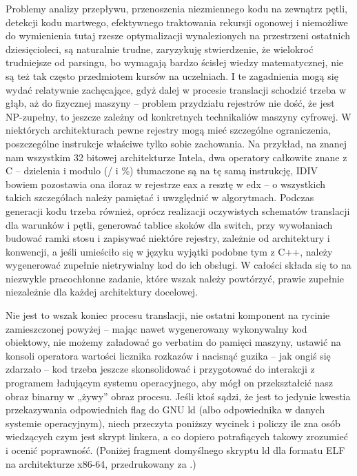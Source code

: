 Problemy analizy przepływu, przenoszenia niezmiennego kodu na zewnątrz pętli, detekcji kodu martwego, efektywnego traktowania rekursji ogonowej i niemożliwe do wymienienia tutaj rzesze optymalizacji wynalezionych na przestrzeni ostatnich dziesięcioleci, są naturalnie trudne, zaryzykuję stwierdzenie, że wielokroć trudniejsze od parsingu, bo wymagają bardzo ścisłej wiedzy matematycznej, nie są też tak często przedmiotem kursów na uczelniach. I te zagadnienia mogą się wydać relatywnie zachęcające, gdyż dalej w procesie translacji schodzić trzeba w głąb, aż do fizycznej maszyny – problem przydziału rejestrów nie dość, że jest NP-zupełny\cite{REGISTER_ALLOCATION_CHAITIN1981, REGISTER_ALLOCATION_2}, to jeszcze zależny od konkretnych technikaliów maszyny cyfrowej. W niektórych architekturach pewne rejestry mogą mieć szczególne ograniczenia, poszczególne instrukcje właściwe tylko sobie zachowania. Na przykład, na znanej nam wszystkim 32 bitowej architekturze Intela, dwa operatory całkowite znane z C – dzielenia i modulo (/ i \%) tłumaczone są na tę samą instrukcję, IDIV bowiem pozostawia ona iloraz w rejestrze eax a resztę w edx – o wszystkich takich szczegółach należy pamiętać i uwzględnić w algorytmach. Podczas generacji kodu trzeba również, oprócz realizacji oczywistych schematów translacji dla warunków i pętli, generować tablice skoków dla switch, przy wywołaniach budować ramki stosu i zapisywać niektóre rejestry, zależnie od architektury i konwencji, a jeśli umieściło się w języku wyjątki podobne tym z C++, należy wygenerować zupełnie nietrywialny kod do ich obsługi. W całości składa się to na niezwykle pracochłonne zadanie, które wszak należy powtórzyć, prawie zupełnie niezależnie dla każdej architektury docelowej.

Nie jest to wszak koniec procesu translacji, nie ostatni komponent na rycinie zamieszczonej powyżej – mając nawet wygenerowany wykonywalny kod obiektowy, nie możemy załadować go verbatim do pamięci maszyny, ustawić na konsoli operatora wartości licznika rozkazów i nacisnąć guzika – jak ongiś się zdarzało – kod trzeba jeszcze skonsolidować i przygotować do interakcji z programem ładującym systemu operacyjnego, aby mógł on przekształcić nasz obraz binarny w „żywy” obraz procesu. Jeśli ktoś sądzi, że jest to jedynie kwestia przekazywania odpowiednich flag do GNU ld (albo odpowiednika w danych systemie operacyjnym), niech przeczyta poniższy wycinek i policzy ile zna osób wiedzących czym jest skrypt linkera, a co dopiero potrafiących takowy zrozumieć i ocenić poprawność.
(Poniżej fragment domyślnego skryptu ld dla formatu ELF na architekturze x86-64, przedrukowany za \cite{default_ld_linker_script}.)

